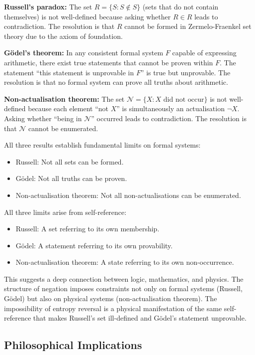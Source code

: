 \documentclass[twocolumn,10pt]{article}
\theoremstyle{definition}
\theoremstyle{remark}
\begin{document}
\textbf{Russell's paradox:} The set $R = \{S : S \notin S\}$ (sets that do not contain themselves) is not well-defined because asking whether $R \in R$ leads to contradiction. The resolution is that $R$ cannot be formed in Zermelo-Fraenkel set theory due to the axiom of foundation.

\textbf{Gödel's theorem:} In any consistent formal system $F$ capable of expressing arithmetic, there exist true statements that cannot be proven within $F$. The statement ``this statement is unprovable in $F$'' is true but unprovable. The resolution is that no formal system can prove all truths about arithmetic.

\textbf{Non-actualisation theorem:} The set $\mathcal{N} = \{X : X \text{ did not occur}\}$ is not well-defined because each element ``not $X$'' is simultaneously an actualisation $\neg X$. Asking whether ``being in $\mathcal{N}$'' occurred leads to contradiction. The resolution is that $\mathcal{N}$ cannot be enumerated.

All three results establish fundamental limits on formal systems:
\begin{itemize}
\item Russell: Not all sets can be formed.
\item Gödel: Not all truths can be proven.
\item Non-actualisation theorem: Not all non-actualisations can be enumerated.
\end{itemize}

All three limits arise from self-reference:
\begin{itemize}
\item Russell: A set referring to its own membership.
\item Gödel: A statement referring to its own provability.
\item Non-actualisation theorem: A state referring to its own non-occurrence.
\end{itemize}

This suggests a deep connection between logic, mathematics, and physics. The structure of negation imposes constraints not only on formal systems (Russell, Gödel) but also on physical systems (non-actualisation theorem). The impossibility of entropy reversal is a physical manifestation of the same self-reference that makes Russell's set ill-defined and Gödel's statement unprovable.

\subsection{Philosophical Implications}
\end{document}
